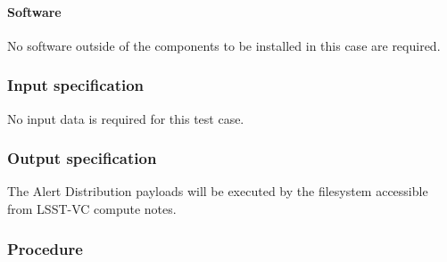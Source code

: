 \paragraph{Software}

No software outside of the components to be installed in this case are required.

\subsubsection{Input specification}

No input data is required for this test case.

\subsubsection{Output specification}

The Alert Distribution payloads will be executed by the 
filesystem accessible from LSST-VC compute notes.

\subsubsection{Procedure}

